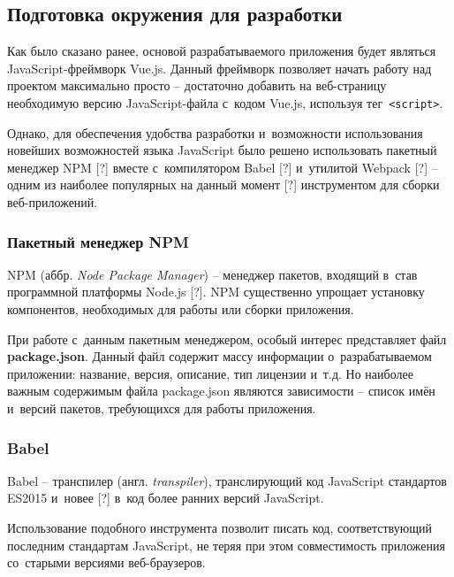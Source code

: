 
\subsection{Подготовка окружения для разработки}

Как было сказано ранее, основой разрабатываемого приложения будет являться JavaScript-фреймворк Vue.js. Данный фреймворк позволяет начать работу над проектом максимально просто -- достаточно добавить на веб-страницу необходимую версию JavaScript-файла с~кодом Vue.js, используя тег \,\verb|<script>|.

Однако, для обеспечения удобства разработки и~возможности использования новейших возможностей языка JavaScript было решено использовать пакетный менеджер NPM [?] вместе с~компилятором Babel [?] и~утилитой Webpack [?] -- одним из наиболее популярных на данный момент [?] инструментом для сборки веб-приложений.


\subsubsection{Пакетный менеджер NPM}

NPM (аббр. \emph{Node Package Manager}) -- менеджер пакетов, входящий в~став программной платформы Node.js [?]. NPM существенно упрощает установку компонентов, необходимых для работы или сборки приложения.

При работе с~данным пакетным менеджером, особый интерес представляет файл \textbf{package.json}. Данный файл содержит массу информации о~разрабатываемом приложении: название, версия, описание, тип лицензии и~т.д. Но наиболее важным содержимым файла package.json являются зависимости -- список имён и~версий пакетов, требующихся для работы приложения.



\subsubsection{Babel}

Babel -- транспилер (англ. \emph{transpiler}), транслирующий код JavaScript стандартов ES2015 и~новее [?] в~код более ранних версий JavaScript.

Использование подобного инструмента позволит писать код, соответствующий последним стандартам JavaScript, не теряя при этом совместимость приложения со~старыми версиями веб-браузеров.

